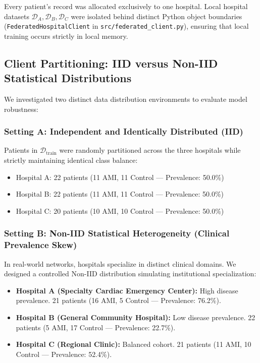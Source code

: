 \documentclass[12pt,a4paper,oneside]{report}
\begin{document}
Every patient's record was allocated exclusively to one hospital. Local hospital datasets $\mathcal{D}_A, \mathcal{D}_B, \mathcal{D}_C$ were isolated behind distinct Python object boundaries (\texttt{FederatedHospitalClient} in \texttt{src/federated\_client.py}), ensuring that local training occurs strictly in local memory.

\subsection{Client Partitioning: IID versus Non-IID Statistical Distributions}
\label{subsec:iid_non_iid}

We investigated two distinct data distribution environments to evaluate model robustness:

\subsubsection{Setting A: Independent and Identically Distributed (IID)}
Patients in $\mathcal{D}_{\text{train}}$ were randomly partitioned across the three hospitals while strictly maintaining identical class balance:
\begin{itemize}
    \item Hospital A: 22 patients (11 AMI, 11 Control — Prevalence: 50.0\%)
    \item Hospital B: 22 patients (11 AMI, 11 Control — Prevalence: 50.0\%)
    \item Hospital C: 20 patients (10 AMI, 10 Control — Prevalence: 50.0\%)
\end{itemize}

\subsubsection{Setting B: Non-IID Statistical Heterogeneity (Clinical Prevalence Skew)}
In real-world networks, hospitals specialize in distinct clinical domains. We designed a controlled Non-IID distribution simulating institutional specialization:
\begin{itemize}
    \item \textbf{Hospital A (Specialty Cardiac Emergency Center):} High disease prevalence. 21 patients (16 AMI, 5 Control — Prevalence: 76.2\%).
    \item \textbf{Hospital B (General Community Hospital):} Low disease prevalence. 22 patients (5 AMI, 17 Control — Prevalence: 22.7\%).
    \item \textbf{Hospital C (Regional Clinic):} Balanced cohort. 21 patients (11 AMI, 10 Control — Prevalence: 52.4\%).
\end{itemize}
\end{document}
